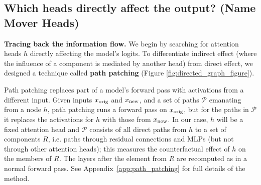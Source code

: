 \subsection{Which heads directly affect the output? (Name Mover Heads)}
\label{sec:name movers} \label{sec:name_movers}
\label{sec:negative heads}

\textbf{Tracing back the information flow.} We begin by searching for attention heads $h$ directly affecting the model's logits. To differentiate indirect effect (where the influence of a component is mediated by another head) from direct effect, we designed a technique called \textbf{path patching} (Figure \ref{fig:directed_graph_figure}). 


Path patching replaces part of a model's forward pass with activations from a different input.
Given inputs $x_{\mathrm{orig}}$ and $x_{\mathrm{new}}$, and a set of paths $\mathcal{P}$ emanating from a node $h$, path patching runs a forward pass on $x_{\mathrm{orig}}$, but for the paths in $\mathcal{P}$
it replaces the activations for $h$ with those from $x_{\mathrm{new}}$. In our case, $h$ will be a fixed attention head
and $\mathcal{P}$ consists of all direct paths from $h$ to a set of components $R$, i.e. paths through residual connections
and MLPs (but not through other attention heads); this measures the counterfactual effect of $h$
on the members of $R$. The layers after the element from $R$ are recomputed as in a normal forward pass. See Appendix~\ref{app:path_patching} for full details of the method.  %

